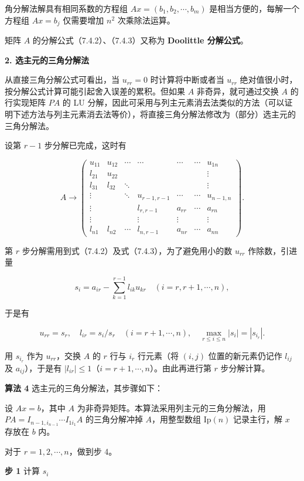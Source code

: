 角分解法解具有相同系数的方程组 \(Ax=(b_1,b_2,\cdots,b_m)\) 是相当方便的，每解一个方程组 \(Ax=b_j\) 仅需要增加 \(n^2\) 次乘除法运算。

矩阵 \(A\) 的分解公式（7.4.2）、（7.4.3）又称为 \textbf{Doolittle 分解公式}。

\textbf{2. 选主元的三角分解法}

从直接三角分解公式可看出，当 \(u_{rr}=0\) 时计算将中断或者当 \(u_{rr}\) 绝对值很小时，按分解公式计算可能引起舍入误差的累积。但如果 \(A\) 非奇异，就可通过交换 \(A\) 的行实现矩阵 \(PA\) 的 LU 分解，因此可采用与列主元素消去法类似的方法（可以证明下述方法与列主元素消去法等价），将直接三角分解法修改为（部分）选主元的三角分解法。

设第 \(r-1\) 步分解已完成，这时有

\[
A\to\begin{pmatrix}
u_{11}&u_{12}&\cdots&\cdots&\cdots&\cdots&u_{1n}\\
l_{21}&u_{22}&&&&&\vdots\\
l_{31}&l_{32}&\ddots&&&&\vdots\\
\vdots&&\ddots&u_{r-1,r-1}&\cdots&\cdots&u_{n-1,n}\\
\vdots&&&l_{r,r-1}&a_{rr}&\cdots&a_{rn}\\
\vdots&&&\vdots&\vdots&&\vdots\\
l_{n1}&l_{n2}&\cdots&l_{n,r-1}&a_{nr}&\cdots&a_{nn}
\end{pmatrix}.
\]

第 \(r\) 步分解需用到式（7.4.2）及式（7.4.3），为了避免用小的数 \(u_{rr}\) 作除数，引进量

\[s_i=a_{ir}-\sum_{k=1}^{r-1}l_{ik}u_{kr}\quad(i=r,r+1,\cdots,n),\]

于是有

\[u_{rr}=s_r,\quad l_{ir}=s_i/s_r\quad(i=r+1,\cdots,n),\quad \max_{r\le i\le n}|s_i|=|s_{i_r}|.\]

用 \(s_{i_r}\) 作为 \(u_{rr}\)，交换 \(A\) 的 \(r\) 行与 \(i_r\) 行元素（将 \((i,j)\) 位置的新元素仍记作 \(l_{ij}\) 及 \(a_{ij}\)），于是有 \(|l_{ir}|\le1\)（\(i=r+1,\cdots,n\)）。由此再进行第 \(r\) 步分解计算。

\textbf{算法 4} 选主元的三角分解法，其步骤如下：

设 \(Ax=b\)，其中 \(A\) 为非奇异矩阵。本算法采用列主元的三角分解法，用 \(PA=I_{n-1,i_{n-1}}\cdots I_{1i_1}A\) 的三角分解冲掉 \(A\)，用整型数组 \(\mathrm{Ip}(n)\) 记录主行，解 \(x\) 存放在 \(b\) 内。

对于 \(r=1,2,\cdots,n\)，做到步 4。

\textbf{步 1} 计算 \(s_i\)

